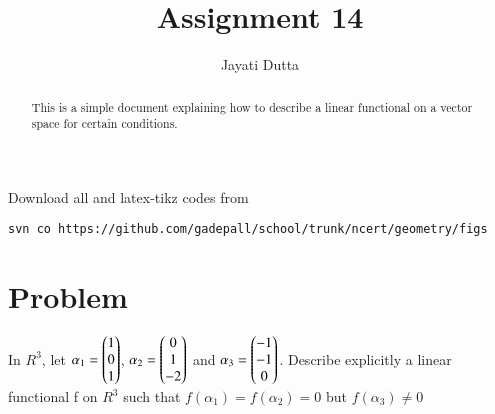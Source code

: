 \documentclass[journal,12pt,twocolumn]{IEEEtran}
\begin{document}
\let\StandardTheFigure\thefigure
\let\vec\mathbf
\renewcommand{\thefigure}{\theproblem}



\def\putbox#1#2#3{\makebox[0in][l]{\makebox[#1][l]{}\raisebox{\baselineskip}[0in][0in]{\raisebox{#2}[0in][0in]{#3}}}}
     \def\rightbox#1{\makebox[0in][r]{#1}}
     \def\centbox#1{\makebox[0in]{#1}}
     \def\topbox#1{\raisebox{-\baselineskip}[0in][0in]{#1}}
     \def\midbox#1{\raisebox{-0.5\baselineskip}[0in][0in]{#1}}

\vspace{3cm}


\title{Assignment 14}
\author{Jayati Dutta}





\maketitle

\newpage


\bigskip

\renewcommand{\thefigure}{\theenumi}
\renewcommand{\thetable}{\theenumi}


\begin{abstract}
This is a simple document explaining how to describe a linear functional on a vector space for certain conditions.
\end{abstract}

%

Download all and latex-tikz codes from 
%
\begin{lstlisting}
svn co https://github.com/gadepall/school/trunk/ncert/geometry/figs
\end{lstlisting}
%


\section{Problem}
In $R^3$, let $\alpha_1 = \begin{pmatrix}1\\0\\1\end{pmatrix}$, $\alpha_2 = \begin{pmatrix}0\\1\\-2\end{pmatrix}$ and $\alpha_3 = \begin{pmatrix}-1\\-1\\0\end{pmatrix}$. Describe explicitly a linear functional f on $R^3$ such that $f(\alpha_1)=f(\alpha_2)=0$ but $f(\alpha_3)\neq 0$
\end{document}
